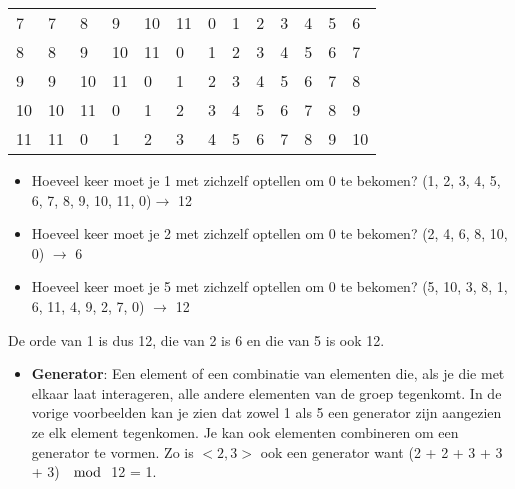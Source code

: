 \documentclass[12pt]{report}
\newcommand{\important}[1] {\textbf{\color{orange}#1}}
\begin{document}
\begin{table}[]
\begin{tabular}{|l|llllllllllll}
		7  & 7                      & 8                      & 9                      & 10                     & 11                     & 0                      & 1                      & 2                      & 3                      & 4  & 5  & 6  \\ \cline{1-1}
		8  & 8                      & 9                      & 10                     & 11                     & 0                      & 1                      & 2                      & 3                      & 4                      & 5  & 6  & 7  \\ \cline{1-1}
		9  & 9                      & 10                     & 11                     & 0                      & 1                      & 2                      & 3                      & 4                      & 5                      & 6  & 7  & 8  \\ \cline{1-1}
		10 & 10                     & 11                     & 0                      & 1                      & 2                      & 3                      & 4                      & 5                      & 6                      & 7  & 8  & 9  \\ \cline{1-1}
		11 & 11                     & 0                      & 1                      & 2                      & 3                      & 4                      & 5                      & 6                      & 7                      & 8  & 9  & 10 \\ \cline{1-1}
	\end{tabular}
	\label{table:groepstabel}
\end{table}
\begin{itemize}[label={*}]
	\item Hoeveel keer moet je 1 met zichzelf optellen om 0 te bekomen? (1, 2, 3, 4, 5, 6, 7, 8, 9, 10, 11, 0)$\rightarrow$ 12
	\item Hoeveel keer moet je 2 met zichzelf optellen om 0 te bekomen? (2, 4, 6, 8, 10, 0) $\rightarrow$ 6
	\item Hoeveel keer moet je 5 met zichzelf optellen om 0 te bekomen? (5, 10, 3, 8, 1, 6, 11, 4, 9, 2, 7, 0) $\rightarrow$ 12
\end{itemize}
De orde van 1 is dus 12, die van 2 is 6 en die van 5 is ook 12.

\begin{itemize}
\item {\important{Generator}: Een element of een combinatie van elementen die, als je die met elkaar laat interageren, alle andere elementen van de groep
  tegenkomt. In de vorige voorbeelden kan je zien dat zowel 1 als 5 een generator zijn aangezien ze elk element tegenkomen.
Je kan ook elementen combineren om een generator te vormen. Zo is $<2, 3>$ ook een generator want (2 + 2 + 3 + 3 + 3) $\mod$ 12 = 1.}
\end{itemize}
\end{document}
